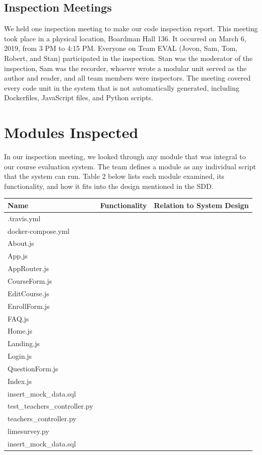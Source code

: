 \documentclass{article}
\begin{document}
\subsection{Inspection Meetings}

We held one inspection meeting to make our code inspection report. This meeting took place in a physical location, Boardman Hall 136. It occurred on March 6, 2019, from 3 PM to 4:15 PM. Everyone on Team EVAL (Jovon, Sam, Tom, Robert, and Stan) participated in the inspection. Stan was the moderator of the inspection, Sam was the recorder, whoever wrote a modular unit served as the author and reader, and all team members were inspectors. The meeting covered every code unit in the system that is not automatically generated, including Dockerfiles, JavaScript files, and Python scripts.

\section{Modules Inspected}

In our inspection meeting, we looked through any module that was integral to our course evaluation system. The team defines a module as any individual script that the system can run. Table 2 below lists each module examined, its functionality, and how it fits into the design mentioned in the SDD.

\begin{center}
\begin{tabular}{|p{4cm}|p{5.5cm}|p{5.5cm}|} 
\hline
\textbf{Name} & \textbf{Functionality} & \textbf{Relation to System Design} \\
\hline
.travis.yml & & \\ 
\hline
docker-compose.yml & & \\  
\hline
About.js & & \\
\hline
App.js & & \\  
\hline
AppRouter.js & & \\ 
\hline
CourseForm.js & & \\ 
\hline
EditCourse.js & & \\ 
\hline
EnrollForm.js & & \\ 
\hline
FAQ.js & & \\
\hline
Home.js & & \\ 
\hline
Landing.js & & \\  
\hline
Login.js & & \\ 
\hline
QuestionForm.js & & \\ 
\hline
Index.js & & \\  
\hline
insert\_mock\_data.sql & & \\ 
\hline
test\_teachers\_controller.py & & \\
\hline
teachers\_controller.py & & \\
\hline
limesurvey.py & & \\ 
\hline
insert\_mock\_data.sql & & \\ 
\hline
\end{tabular}
\end{center}
\end{document}
